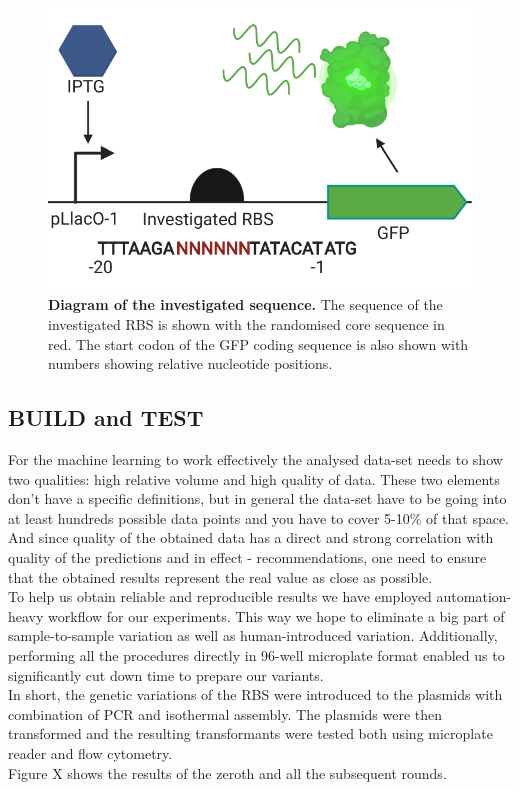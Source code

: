 \documentclass{article}
\begin{document}
\begin{figure}[t]
    \centering
    \includegraphics[scale=0.6]{plots/RBS_anatomy.pdf}
    \caption{\textbf{Diagram of the investigated sequence.} The sequence of the investigated RBS is shown with the randomised core sequence in red. The start codon of the GFP coding sequence is also shown with numbers showing relative nucleotide positions.}
    \label{fig: Anatomy of the randomized sequence.}
\end{figure}

\subsection{BUILD and TEST}

For the machine learning to work effectively the analysed data-set needs to show two qualities: high relative volume and high quality of data.
These two elements don't have a specific definitions, but in general the data-set have to be going into at least hundreds possible data points and you have to cover 5-10\% of that space.
And since quality of the obtained data has a direct and strong correlation with quality of the predictions and in effect - recommendations, one need to ensure that the obtained results represent the real value as close as possible.\\
To help us obtain reliable and reproducible results we have employed automation-heavy workflow for our experiments.
This way we hope to eliminate a big part of sample-to-sample variation as well as human-introduced variation.
Additionally, performing all the procedures directly in 96-well microplate format enabled us to significantly cut down time to prepare our variants.\\
In short, the genetic variations of the RBS were introduced to the plasmids with combination of PCR and isothermal assembly.
The plasmids were then transformed and the resulting transformants were tested both using microplate reader and flow cytometry.\\
Figure X shows the results of the zeroth and all the subsequent rounds.\\
\end{document}
